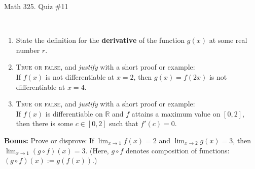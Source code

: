 \documentclass[12pt]{amsart}
\newcommand{\R}{\mathbb{R}}
\begin{document}
	
	\thispagestyle{empty}
	
	\begin{center}
		\Large{Math 325. Quiz \#11 }\\

	\end{center}
	
	\
	
\begin{enumerate}
		\item State the definition for the \textbf{derivative} of the function $g(x)$ at some real number $r$.
		\vfill
		\vfill



\item  \textsc{True or false}, and \emph{justify} with a short proof or example:\\
If $f(x)$ is not differentiable at $x=2$, then $g(x)= f(2x)$ is not differentiable at $x=4$.


	
	\vfill	\vfill\vfill
	

	
	
\item  \textsc{True or false}, and \emph{justify} with a short proof or example:\\
If $f(x)$ is differentiable on $\R$ and $f$ attains a maximum value on $[0,2]$, then there is some $c\in [0,2]$ such that $f'(c)=0$.
\vfill\vfill\vfill





\end{enumerate}




\newpage

\noindent \textbf{Bonus:} Prove or disprove: If $\lim_{x\to 1} f(x) = 2$ and $\lim_{x\to 2} g(x) = 3$, then $\lim_{x\to 1} (g \circ f)(x) = 3$. (Here, $g \circ f$ denotes composition of functions: $(g\circ f)(x) := g(f(x))$.)
	
	
\end{document}
